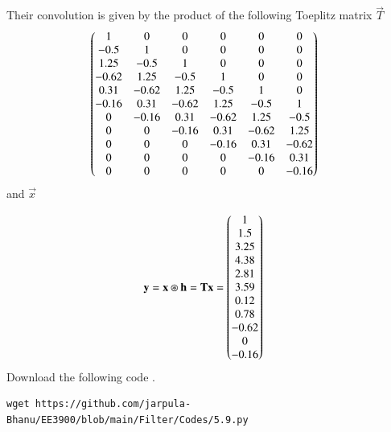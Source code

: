 \documentclass[journal,12pt,twocolumn]{IEEEtran}
\renewcommand\thesection{\arabic{section}}
\begin{document}
\begin{enumerate}[label=\thesection.\arabic*
,ref=\thesection.\theenumi]
Their convolution is given by the product of the following Toeplitz matrix $\vec{T}$
\begin{align}
	&\begin{pmatrix}
		1 & 0 & 0 & 0 & 0 & 0 \\
		-0.5 & 1 & 0 & 0 & 0 & 0 \\
		1.25 & -0.5 & 1 & 0 & 0 & 0 \\
		-0.62 & 1.25 & -0.5 & 1 & 0 & 0 \\
		0.31 & -0.62 & 1.25 & -0.5 & 1 & 0 \\
		-0.16 & 0.31 & -0.62 & 1.25 & -0.5 & 1 \\
		0 & -0.16 & 0.31 & -0.62 & 1.25 & -0.5 \\
		0 & 0 & -0.16 & 0.31 & -0.62 & 1.25 \\
		0 & 0 & 0 & -0.16 & 0.31 & -0.62 \\
		0 & 0 & 0 & 0 & -0.16 & 0.31 \\
		0 & 0 & 0 & 0 & 0 & -0.16 \\
	\end{pmatrix} 
\end{align}
and $\vec{x}$

\begin{align}
	&\mathbf{y} = \mathbf{x} \circledast \mathbf{h} = \mathbf{Tx} = \begin{pmatrix}1 \\ 1.5 \\ 3.25 \\ 4.38 \\ 2.81 \\ 3.59 \\ 0.12 \\ 0.78 \\ -0.62 \\ 0 \\ -0.16\end{pmatrix}
\end{align}
Download the following code .
\begin{lstlisting}
wget https://github.com/jarpula-Bhanu/EE3900/blob/main/Filter/Codes/5.9.py
\end{lstlisting}


\end{enumerate}
\end{document}

